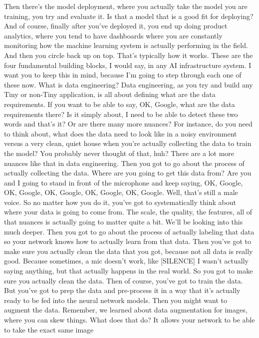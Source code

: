 Then there's the model deployment, where you actually
take the model you are training, you try and evaluate it.
Is that a model that is a good fit for deploying?
And of course, finally after you've deployed it,
you end up doing product analytics, where
you tend to have dashboards where you are constantly
monitoring how the machine learning system is actually
performing in the field.
And then you circle back up on top.
That's typically how it works.
These are the four fundamental building blocks,
I would say, in any AI infrastructure system.
I want you to keep this in mind, because I'm going
to step through each one of these now.
What is data engineering?
Data engineering, as you try and build any Tiny or non-Tiny application,
is all about defining what are the data requirements.
If you want to be able to say, OK, Google,
what are the data requirements there?
Is it simply about, I need to be able to detect these two words and that's it?
Or are there many more nuances?
For instance, do you need to think about,
what does the data need to look like in a noisy environment versus a very
clean, quiet house when you're actually collecting the data to train the model?
You probably never thought of that, huh?
There are a lot more nuances like that in data engineering.
Then you got to go about the process of actually collecting the data.
Where are you going to get this data from?
Are you and I going to stand in front of the microphone
and keep saying, OK, Google, OK, Google, OK, Google, OK, Google, OK, Google.
Well, that's still a male voice.
So no matter how you do it, you've got to systematically think about where
your data is going to come from.
The scale, the quality, the features, all of that nuances
is actually going to matter quite a bit.
We'll be looking into this much deeper.
Then you got to go about the process of actually labeling that data
so your network knows how to actually learn from that data.
Then you've got to make sure you actually clean the data that you got,
because not all data is really good.
Because sometimes, a mic doesn't work, like [SILENCE]
I wasn't actually saying anything, but that
actually happens in the real world.
So you got to make sure you actually clean the data.
Then of course, you've got to train the data.
But you've got to prep the data and pre-process it in a way
that it's actually ready to be fed into the neural network models.
Then you might want to augment the data.
Remember, we learned about data augmentation
for images, where you can skew things.
What does that do?
It allows your network to be able to take the exact same image
